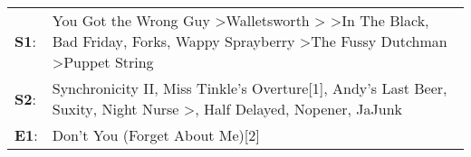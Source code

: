 \begin{supertabular}{p{0.03\textwidth}p{0.92\textwidth}}
 \textbf{S1}:  &  You Got the Wrong Guy\textsuperscript{} \textgreater \enspace Walletsworth\textsuperscript{} \textgreater {}\textsuperscript{} \textgreater \enspace In The Black\textsuperscript{}, \enspace Bad Friday\textsuperscript{}, \enspace Forks\textsuperscript{}, \enspace Wappy Sprayberry\textsuperscript{} \textgreater \enspace The Fussy Dutchman\textsuperscript{} \textgreater \enspace Puppet String\textsuperscript{}  \enspace  \\
 \textbf{S2}:  &                                                          Synchronicity II\textsuperscript{}, \enspace Miss Tinkle's Overture[1]\textsuperscript{}, \enspace Andy's Last Beer\textsuperscript{}, \enspace Suxity\textsuperscript{}, \enspace Night Nurse\textsuperscript{} \textgreater {}\textsuperscript{}, \enspace Half Delayed\textsuperscript{}, \enspace Nopener\textsuperscript{}, \enspace JaJunk\textsuperscript{}  \enspace  \\
 \textbf{E1}:  &                                                                                                                                                                                                                                                                                                                                                                                       Don't You (Forget About Me)[2]\textsuperscript{}  \enspace  \\
\end{supertabular}
